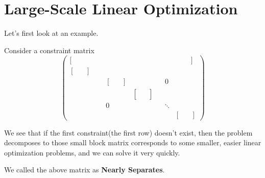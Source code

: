\section{Large-Scale Linear Optimization}

Let's first look at an example.
\begin{eg}
	Consider a constraint matrix
	\[
		\left(\begin{array}{cccccc}
				[\quad\quad\quad\quad                  &                                        &                                        &  &        & \quad\ \quad]                          \\
				\left[\begin{array}{cc} & \\ &\end{array}\right] &                                        &                                        &  &        &                                        \\
				                                       & \left[\begin{array}{cc} & \end{array}\right] &                                        &  & 0      &                                        \\
				                                       &                                        & \left[\begin{array}{cc} & \\ & \\ & \end{array}\right] &  &        &                                        \\
				                                       & 0                                      &                                        &  & \ddots                                          \\
				                                       &                                        &                                        &  &        & \left[\begin{array}{cc} & \\ & \end{array}\right]
			\end{array}\right)
	\]

	We see that if the first constraint(the first row) doesn't exist, then the problem decomposes to
	those small block matrix corresponds to some smaller, easier linear optimization problems, and we can solve it very quickly.

	\begin{note}
		We called the above matrix as \textbf{Nearly Separates}.
	\end{note}
\end{eg}

